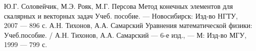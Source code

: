 \documentclass[14pt,a4paper]{extreport}
\begin{document}

%

\newpage

\tableofcontents
\newpage

\setcounter{page}{3}

%


%
%

\newpage

\renewcommand\bibname{СПИСОК ЛИТЕРАТУРЫ}

\begin{thebibliography}{00}
			Ю.Г. Соловейчик, М.Э. Рояк, М.Г. Персова Метод конечных элементов для скалярных и векторных задач Учеб. пособие. — Новосибирск: Изд-во НГТУ, 2007 — 896 с.
            А.Н. Тихонов, А.А. Самарский Уравнения математической физики: Учеб.пособие. / А.Н. Тихонов, А.А. Самарский — 6-е изд., — М: Изд-во МГУ, 1999 — 799 с.
\end{thebibliography}

\newpage

\end{document}
